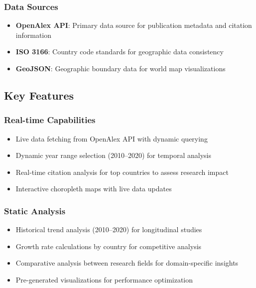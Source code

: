 \subsubsection{Data Sources}

\begin{itemize}
\item \textbf{OpenAlex API}: Primary data source for publication metadata and citation information
\item \textbf{ISO 3166}: Country code standards for geographic data consistency
\item \textbf{GeoJSON}: Geographic boundary data for world map visualizations
\end{itemize}

\subsection{Key Features}

\subsubsection{Real-time Capabilities}

\begin{itemize}
\item Live data fetching from OpenAlex API with dynamic querying
\item Dynamic year range selection (2010--2020) for temporal analysis
\item Real-time citation analysis for top countries to assess research impact
\item Interactive choropleth maps with live data updates
\end{itemize}

\subsubsection{Static Analysis}

\begin{itemize}
\item Historical trend analysis (2010--2020) for longitudinal studies
\item Growth rate calculations by country for competitive analysis
\item Comparative analysis between research fields for domain-specific insights
\item Pre-generated visualizations for performance optimization
\end{itemize}

